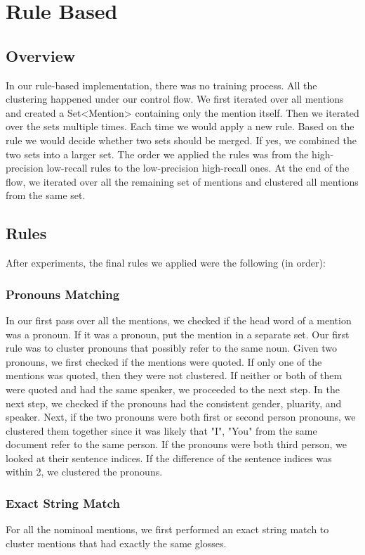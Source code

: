 \documentclass[12pt, twocolumn]{article}
\begin{document}
\section{Rule Based}
\subsection{Overview}
In our rule-based implementation, there was no training process. All the clustering happened under our control flow. 
We first iterated over all mentions and created a Set<Mention> containing only the mention itself. Then we iterated over the sets multiple times. Each time we would apply a new rule. Based on the rule we would decide whether two sets should be merged. If yes, we combined the two sets into a larger set. The order we applied the rules was from the high-precision low-recall rules to the low-precision high-recall ones. 
At the end of the flow, we iterated over all the remaining set of mentions and clustered all mentions from the same set.

\subsection{Rules}
After experiments, the final rules we applied were the following (in order):

\subsubsection{Pronouns Matching}
In our first pass over all the mentions, we checked if the head word of a mention was a pronoun. If it was a pronoun, put the mention in a separate set.
Our first rule was to cluster pronouns that possibly refer to the same noun. Given two pronouns, we first checked if the mentions were quoted. If only one of the mentions was quoted, then they were not clustered. If neither or both of them were quoted and had the same speaker, we proceeded to the next step. In the next step, we checked if the pronouns had the consistent gender, pluarity, and speaker. Next, if the two pronouns were both first or second person pronouns, we clustered them together since it was likely that "I", "You" from the same document refer to the same person. If the pronouns were both third person, we looked at their sentence indices. If the difference of the sentence indices was within 2, we clustered the pronouns. 

\subsubsection{Exact String Match}
For all the nominoal mentions, we first performed an exact string match to cluster mentions that had exactly the same glosses.
\end{document}
